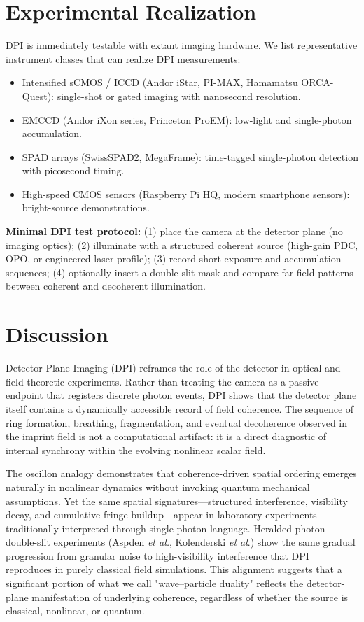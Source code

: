 \section{Experimental Realization}
DPI is immediately testable with extant imaging hardware. We list representative instrument classes that can realize DPI measurements:

\begin{itemize}
  \item Intensified sCMOS / ICCD (Andor iStar, PI-MAX, Hamamatsu ORCA-Quest): single-shot or gated imaging with nanosecond resolution.
  \item EMCCD (Andor iXon series, Princeton ProEM): low-light and single-photon accumulation.
  \item SPAD arrays (SwissSPAD2, MegaFrame): time-tagged single-photon detection with picosecond timing.
  \item High-speed CMOS sensors (Raspberry Pi HQ, modern smartphone sensors): bright-source demonstrations.
\end{itemize}

\noindent\textbf{Minimal DPI test protocol:}
(1) place the camera at the detector plane (no imaging optics); (2) illuminate with a structured coherent source (high-gain PDC, OPO, or engineered laser profile); (3) record short-exposure and accumulation sequences; (4) optionally insert a double-slit mask and compare far-field patterns between coherent and decoherent illumination.

\section{Discussion}
Detector-Plane Imaging (DPI) reframes the role of the detector in optical and field-theoretic experiments. Rather than treating the camera as a passive endpoint that registers discrete photon events, DPI shows that the detector plane itself contains a dynamically accessible record of field coherence. The sequence of ring formation, breathing, fragmentation, and eventual decoherence observed in the imprint field is not a computational artifact: it is a direct diagnostic of internal synchrony within the evolving nonlinear scalar field.

The oscillon analogy demonstrates that coherence-driven spatial ordering emerges naturally in nonlinear dynamics without invoking quantum mechanical assumptions. Yet the same spatial signatures---structured interference, visibility decay, and cumulative fringe buildup---appear in laboratory experiments traditionally interpreted through single-photon language. Heralded-photon double-slit experiments (Aspden \textit{et al.}, Kolenderski \textit{et al}.) show the same gradual progression from granular noise to high-visibility interference that DPI reproduces in purely classical field simulations. This alignment suggests that a significant portion of what we call "wave--particle duality" reflects the detector-plane manifestation of underlying coherence, regardless of whether the source is classical, nonlinear, or quantum.

